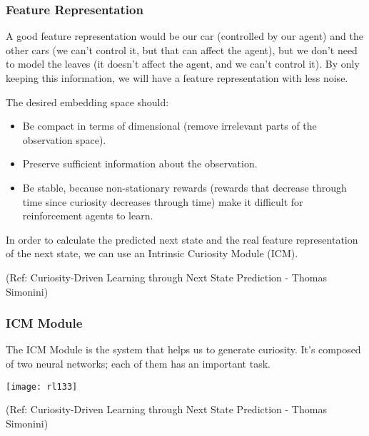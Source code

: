 \begin{frame}[fragile]\frametitle{Feature Representation}

A good feature representation would be our car (controlled by our agent) and the other cars (we can’t control it, but that can affect the agent), but we don’t need to model the leaves (it doesn’t affect the agent, and we can’t control it). By only keeping this information, we will have a feature representation with less noise.

The desired embedding space should:

\begin{itemize}
\item Be compact in terms of dimensional (remove irrelevant parts of the observation space).
\item Preserve sufficient information about the observation.
\item Be stable, because non-stationary rewards (rewards that decrease through time since curiosity decreases through time) make it difficult for reinforcement agents to learn.
\end{itemize}

In order to calculate the predicted next state and the real feature representation of the next state, we can use an Intrinsic Curiosity Module (ICM).

{\tiny (Ref: Curiosity-Driven Learning through Next State Prediction - Thomas Simonini)}


\end{frame}

\begin{frame}[fragile]\frametitle{ICM Module}

The ICM Module is the system that helps us to generate curiosity. It’s composed of two neural networks; each of them has an important task.

\begin{center}
\texttt{[image: rl133]}
\end{center}


{\tiny (Ref: Curiosity-Driven Learning through Next State Prediction - Thomas Simonini)}


\end{frame}

